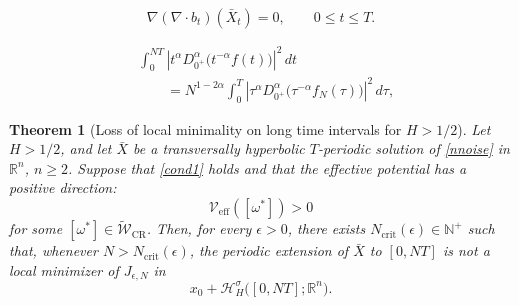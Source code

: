 \documentclass[10pt,a4paper]{amsart}
\newtheorem{theorem}{Theorem}
\begin{document}
\begin{equation}
\label{cond1}
    \nabla(\nabla\!\cdot b_t)(\bar X_t)=0,
    \qquad
    0\leq t\leq T.
\end{equation}

\begin{equation}
\label{eq:scaling-weighted-fractional-derivative}
\begin{aligned}
&\int_0^{NT}
\left|
    t^\alpha D_{0^+}^\alpha
    \bigl(t^{-\alpha}f(t)\bigr)
\right|^2\,dt
\\
&\qquad=
N^{1-2\alpha}
\int_0^T
\left|
    \tau^\alpha D_{0^+}^\alpha
    \bigl(\tau^{-\alpha}f_N(\tau)\bigr)
\right|^2\,d\tau,
\end{aligned}
\end{equation}

\begin{theorem}[Loss of local minimality on long time intervals for $H>1/2$]
\label{thm:H-greater-half-collapse}
Let $H>1/2$, and let $\bar X$ be a transversally hyperbolic
$T$-periodic solution of \eqref{nnoise} in $\mathbb R^n$, $n\geq2$.
Suppose that \eqref{cond1} holds and that the effective potential has
a positive direction:
\begin{equation*}
    \mathcal V_{\mathrm{eff}}([\omega^*])>0
\end{equation*}
for some
$[\omega^*]\in\widetilde{\mathcal W}_{\mathrm{CR}}$. Then, for every
$\epsilon>0$, there exists
$N_{\mathrm{crit}}(\epsilon)\in\mathbb N^+$ such that, whenever
$N>N_{\mathrm{crit}}(\epsilon)$, the periodic extension of $\bar X$ to
$[0,NT]$ is not a local minimizer of $J_{\epsilon,N}$ in
\begin{equation*}
    x_0+
    \mathcal H_H^\sigma\bigl([0,NT];\mathbb R^n\bigr).
\end{equation*}
\end{theorem}
\end{document}
